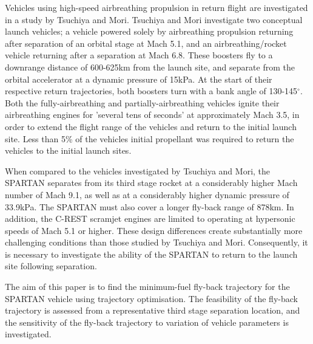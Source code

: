 \documentclass[journal]{new-aiaa} %
\begin{document}
Vehicles using high-speed airbreathing propulsion in return flight are investigated in a study by Tsuchiya and Mori\cite{Tsuchiya2005}.  Tsuchiya and Mori investigate two conceptual launch vehicles; a vehicle powered solely by airbreathing propulsion returning after separation of an orbital stage at Mach 5.1, and an airbreathing/rocket vehicle returning after a separation at Mach 6.8\cite{Tsuchiya2005}. 
These boosters fly to a downrange distance of 600-625km from the launch site, and separate from the orbital accelerator at a dynamic pressure of 15kPa\cite{Tsuchiya2005}. At the start of their respective return trajectories, both boosters turn with a bank angle of 130-145$^\circ$. Both the fully-airbreathing and partially-airbreathing vehicles ignite their airbreathing engines for 'several tens of seconds' at approximately Mach 3.5, in order to extend the flight range of the vehicles and return to the initial launch site\cite{Tsuchiya2005}. Less than 5\% of the vehicles initial propellant was required to return the vehicles to the initial launch sites\cite{Tsuchiya2005}.

When compared to the vehicles investigated by Tsuchiya and Mori\cite{Tsuchiya2005}, the SPARTAN separates from its third stage rocket at a considerably higher Mach number of Mach 9.1, as well as at a considerably higher dynamic pressure of 33.9kPa. The SPARTAN must also cover a longer fly-back range of 878km. In addition, the C-REST scramjet engines are limited to operating at hypersonic speeds of Mach 5.1 or higher. These design differences create substantially more challenging conditions than those studied by Tsuchiya and Mori. Consequently, it is necessary to investigate the ability of the SPARTAN to return to the launch site following separation. 

The aim of this paper is to find the minimum-fuel fly-back trajectory for the SPARTAN vehicle using trajectory optimisation. The feasibility of the fly-back trajectory is assessed from a representative third stage separation location, and the sensitivity of the fly-back trajectory to variation of vehicle parameters is investigated. 








\end{document}
